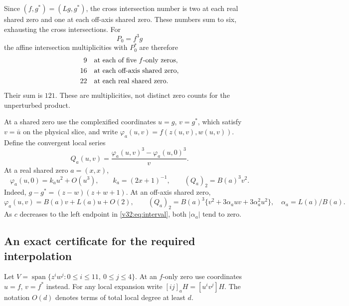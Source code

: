 \documentclass[UTF8,11pt]{ctexart}
\theoremstyle{definition}
\numberwithin{equation}{section}
\begin{document}
Since $(f,g^*)=(Lg,g^*)$, the cross intersection number is two
at each real shared zero and one at each off-axis shared zero.
These numbers sum to six, exhausting the cross intersections.
For
\[
 P_0=f^3g
\]
the affine intersection multiplicities with $P_0^*$ are therefore
\begin{equation}\label{v32:eq:multiplicities}
 \begin{aligned}
 9&\quad\hbox{at each of five $f$-only zeros},\\
 16&\quad\hbox{at each off-axis shared zero},\\
 22&\quad\hbox{at each real shared zero}.
 \end{aligned}
\end{equation}
Their sum is $121$. These are multiplicities, not distinct
zero counts for the unperturbed product.

At a shared zero use the complexified coordinates $u=g$, $v=g^*$,
which satisfy $v=\bar u$ on the physical slice, and write
$\varphi_a(u,v)=f(z(u,v),w(u,v))$. Define the convergent local series
\begin{equation}\label{v32:eq:Q}
 Q_a(u,v)=\frac{\varphi_a(u,v)^3-\varphi_a(u,0)^3}{v}.
\end{equation}
At a real shared zero $a=(x,x)$,
\begin{equation}\label{v32:eq:tangentjet}
 \varphi_a(u,0)=k_a u^2+O(u^3),\qquad
 k_a=(2x+1)^{-1},\qquad
 (Q_a)_2=B(a)^3v^2.
\end{equation}
Indeed, $g-g^*=(z-w)(z+w+1)$.
At an off-axis shared zero,
\begin{equation}\label{v32:eq:transversejet}
 \varphi_a(u,v)=B(a)v+L(a)u+O(2),\qquad
 (Q_a)_2=B(a)^3\{v^2+3\alpha_a uv+3\alpha_a^2u^2\},
 \quad\alpha_a=L(a)/B(a).
\end{equation}
As $c$ decreases to the left endpoint in
\eqref{v32:eq:interval}, both $|\alpha_a|$ tend to zero.

\subsection{An exact certificate for the required interpolation}

Let $V=\operatorname{span}\{z^iw^j:0\le i\le11,\ 0\le j\le4\}$.
At an $f$-only zero use coordinates $u=f$, $v=f^*$ instead.
For any local expansion write $[ij]_aH=[u^iv^j]H$.
The notation $O(d)$ denotes terms of total local degree at least $d$.
\end{document}
